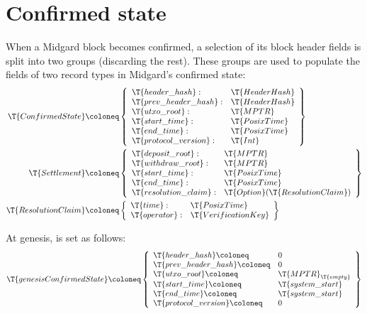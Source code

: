 \documentclass[../midgard.tex]{subfiles}
\begin{document}
\section{Confirmed state}
\label{h:confirmed-state}

When a Midgard block becomes confirmed, a selection of its block header fields is split into two groups (discarding the rest).
These groups are used to populate the fields of two record types in Midgard's confirmed state:
\begingroup
\allowdisplaybreaks
\begin{align*}
    \T{ConfirmedState} &\coloneq \left\{
    \begin{array}{ll}
        \T{header\_hash} : & \T{HeaderHash} \\
        \T{prev\_header\_hash} : & \T{HeaderHash} \\
        \T{utxo\_root} : & \T{MPTR} \\
        \T{start\_time} : & \T{PosixTime} \\
        \T{end\_time} : & \T{PosixTime} \\
        \T{protocol\_version} : & \T{Int} \\
    \end{array} \right\} \\
    \T{Settlement} &\coloneq \left\{
    \begin{array}{ll}
        \T{deposit\_root} : & \T{MPTR} \\
        \T{withdraw\_root} : & \T{MPTR} \\
        \T{start\_time}: & \T{PosixTime} \\
        \T{end\_time}: & \T{PosixTime} \\
        \T{resolution\_claim}: & \T{Option}(\T{ResolutionClaim})
    \end{array} \right\} \\
    \T{ResolutionClaim} &\coloneq \left\{
    \begin{array}{ll}
        \T{time}: & \T{PosixTime} \\
        \T{operator}: & \T{VerificationKey}
    \end{array}
    \right\}
\end{align*}
\endgroup

At genesis,  is set as follows:
\begin{equation*}
    \T{genesisConfirmedState} \coloneq \left\{
        \begin{array}{ll}
            \T{header\_hash} \coloneq & 0 \\
            \T{prev\_header\_hash} \coloneq & 0 \\
            \T{utxo\_root} \coloneq & \T{MPTR}_\T{empty} \\
            \T{start\_time} \coloneq & \T{system\_start} \\
            \T{end\_time} \coloneq & \T{system\_start} \\
            \T{protocol\_version} \coloneq & 0
        \end{array} \right\}
\end{equation*}
\end{document}
